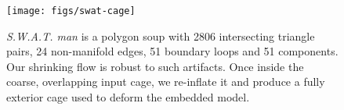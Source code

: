 \begin{figure}
  \texttt{[image: figs/swat-cage]}
  \caption{\emph{S.W.A.T. man} is a polygon soup with 2806 
  intersecting triangle pairs, 24 non-manifold edges, 51 boundary loops and 51
  components. Our shrinking flow is robust to such artifacts. Once
  inside the coarse, overlapping input cage, we re-inflate it and produce a
  fully exterior cage used to deform the embedded model.}
  \label{fig:swat-cage}
\end{figure}
